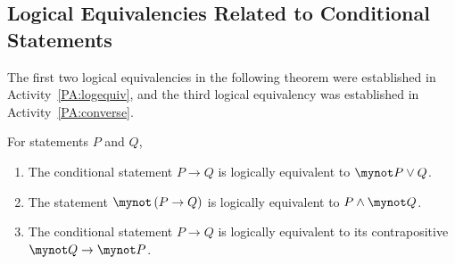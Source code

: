 \subsection*{Logical Equivalencies Related to Conditional Statements}
%
The first two logical equivalencies in the following theorem were established in \typeu Activity~\ref*{PA:logequiv}, and the third logical equivalency was established in \typeu  Activity~\ref*{PA:converse}.  
\begin{theorem} \label{T:logical-condition}
For statements $P$ and $Q$,
\begin{enumerate}
  \item The conditional statement  $P \to Q$ is logically equivalent to  $\mynot  P \vee Q$.
  \item The statement  $\mynot  \left( {P \to Q} \right)$ is logically equivalent to  $P \wedge \mynot  Q$.
  \item The conditional statement  $P \to Q$ is logically equivalent to its contrapositive  $\mynot  Q \to \mynot  P$.
\end{enumerate}
\end{theorem}
%
%
%
%
